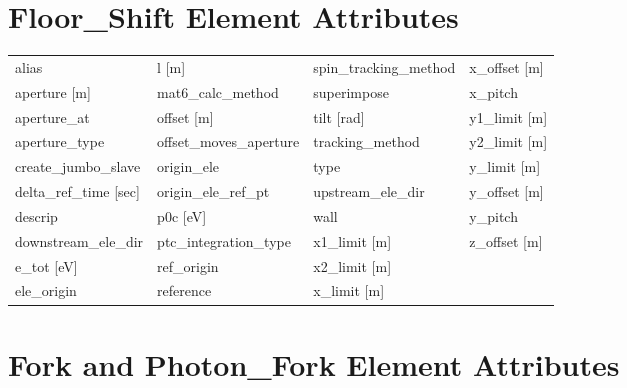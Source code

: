  \section{Floor_Shift Element Attributes}
 \label{s:list.floor.shift}
 
 \begin{tabular}{llll} \toprule
alias                            & l [m]                            & spin_tracking_method             & x_offset [m]                     \\
aperture [m]                     & mat6_calc_method                 & superimpose                      & x_pitch                          \\
aperture_at                      & offset [m]                       & tilt [rad]                       & y1_limit [m]                     \\
aperture_type                    & offset_moves_aperture            & tracking_method                  & y2_limit [m]                     \\
create_jumbo_slave               & origin_ele                       & type                             & y_limit [m]                      \\
delta_ref_time [sec]             & origin_ele_ref_pt                & upstream_ele_dir                 & y_offset [m]                     \\
descrip                          & p0c [eV]                         & wall                             & y_pitch                          \\
downstream_ele_dir               & ptc_integration_type             & x1_limit [m]                     & z_offset [m]                     \\
e_tot [eV]                       & ref_origin                       & x2_limit [m]                     &                                  \\
ele_origin                       & reference                        & x_limit [m]                      &                                  \\
 \bottomrule
 \end{tabular}
 \vfill
 
 \section{Fork and Photon_Fork Element Attributes}
 \label{s:list.fork}
 
